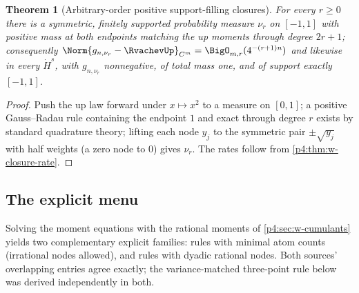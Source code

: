 \documentclass[11pt,oneside]{article}
\numberwithin{equation}{section}
\newtheorem{theorem}{Theorem}[section]
\theoremstyle{definition}
\theoremstyle{remark}
\begin{document}
\begin{theorem}[Arbitrary-order positive support-filling closures]
\label{p4:thm:w-existence}
For every $r\ge0$ there is a symmetric, finitely supported probability
measure $\nu_r$ on $[-1,1]$ with positive mass at both endpoints matching
the up moments through degree $2r+1$; consequently
$\Norm{g_{n,\nu_r}-\RvachevUp}_{C^m}=\BigO_{m,r}(4^{-(r+1)n})$ and likewise in
every $\dot H^s$, with $g_{n,\nu_r}$ nonnegative, of total mass one, and of
support exactly $[-1,1]$.
\end{theorem}

\begin{proof}
Push the up law forward under $x\mapsto x^2$ to a measure on $[0,1]$; a
positive Gauss--Radau rule containing the endpoint $1$ and exact through
degree $r$ exists by standard quadrature theory; lifting each node $y_j$ to
the symmetric pair $\pm\sqrt{y_j}$ with half weights (a zero node to $0$)
gives $\nu_r$.  The rates follow from \cref{p4:thm:w-closure-rate}.
\end{proof}

\subsection{The explicit menu}

Solving the moment equations with the rational moments of
\cref{p4:sec:w-cumulants} yields two complementary explicit families: rules
with minimal atom counts (irrational nodes allowed), and rules with dyadic
rational nodes.  Both sources' overlapping entries agree exactly; the
variance-matched three-point rule below was derived independently in both.
\end{document}
